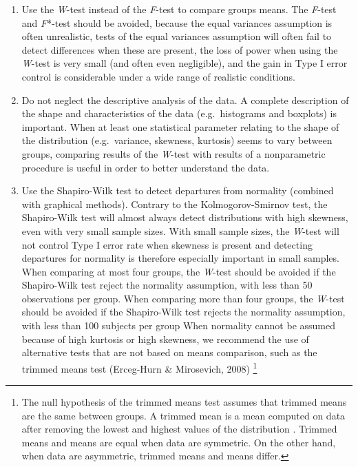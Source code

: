 \documentclass[man,floatsintext]{apa6}
\let\rmarkdownfootnote\footnote%
\def\footnote{\protect\rmarkdownfootnote}
\begin{document}
\begin{enumerate}
\def\labelenumi{\arabic{enumi}.}
\item
  Use the \emph{W}-test instead of the \emph{F}-test to compare groups
  means. The \emph{F}-test and \emph{F}*-test should be avoided, because
  the equal variances assumption is often unrealistic, tests of the
  equal variances assumption will often fail to detect differences when
  these are present, the loss of power when using the \emph{W}-test is
  very small (and often even negligible), and the gain in Type I error
  control is considerable under a wide range of realistic conditions.
\item
  Do not neglect the descriptive analysis of the data. A complete
  description of the shape and characteristics of the data
  (e.g.~histograms and boxplots) is important. When at least one
  statistical parameter relating to the shape of the distribution
  (e.g.~variance, skewness, kurtosis) seems to vary between groups,
  comparing results of the \emph{W}-test with results of a nonparametric
  procedure is useful in order to better understand the data.\\
\item
  Use the Shapiro-Wilk test to detect departures from normality
  (combined with graphical methods). Contrary to the Kolmogorov-Smirnov
  test, the Shapiro-Wilk test will almost always detect distributions
  with high skewness, even with very small sample sizes. With small
  sample sizes, the \emph{W}-test will not control Type I error rate
  when skewness is present and detecting departures for normality is
  therefore especially important in small samples. When comparing at
  most four groups, the \emph{W}-test should be avoided if the
  Shapiro-Wilk test reject the normality assumption, with less than 50
  observations per group. When comparing more than four groups, the
  \emph{W}-test should be avoided if the Shapiro-Wilk test rejects the
  normality assumption, with less than 100 subjects per group When
  normality cannot be assumed because of high kurtosis or high skewness,
  we recommend the use of alternative tests that are not based on means
  comparison, such as the trimmed means test (Erceg-Hurn \& Mirosevich,
  2008)
  \footnote{The null hypothesis of the trimmed means test assumes that trimmed means are the same between groups. A trimmed mean is a mean computed on data after removing the lowest and highest values of the distribution . Trimmed means and means are equal when data are symmetric. On the other hand, when data are asymmetric, trimmed means and means differ.}

\end{enumerate}
\end{document}
